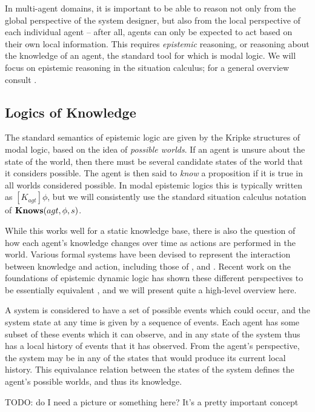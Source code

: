 In multi-agent domains, it is important to be able to reason not only
from the global perspective of the system designer, but also from
the local perspective of each individual agent -- after all, agents
can only be expected to act based on their own local information.
This requires \emph{epistemic} reasoning, or reasoning about the knowledge
of an agent, the standard tool for which is modal logic. We will focus
on epistemic reasoning in the situation calculus; for a general overview
consult \citep{fagin95}.


\subsection{Logics of Knowledge}

The standard semantics of epistemic logic are given by the Kripke
structures of modal logic, based on the idea of \emph{possible worlds}.
If an agent is unsure about the state of the world, then there must
be several candidate states of the world that it considers possible.
The agent is then said to \emph{know} a proposition if it is true
in all worlds considered possible. In modal epistemic logics this
is typically written as $[K_{agt}]\phi$, but we will consistently
use the standard situation calculus notation of $\mathbf{Knows}(agt,\phi,s)$.

While this works well for a static knowledge base, there is also the
question of how each agent's knowledge changes over time as actions
are performed in the world. Various formal systems have been devised
to represent the interaction between knowledge and action, including
those of \citet{fagin95}, \citet{parikh85dist_knowledge} and \citet{baltag98pa_ck}.
Recent work on the foundations of epistemic dynamic logic has shown
these different perspectives to be essentially equivalent \citep{vanBentham06tree_of_knowledge,pacuit07history_structures},
and we will present quite a high-level overview here.

A system is considered to have a set of possible events which could
occur, and the system state at any time is given by a sequence of
events. Each agent has some subset of these events which it can observe,
and in any state of the system thus has a local history of events
that it has observed. From the agent's perspective, the system may
be in any of the states that would produce its current local history.
This equivalance relation between the states of the system defines
the agent's possible worlds, and thus its knowledge.

TODO: do I need a picture or something here? It's a pretty important
concept



